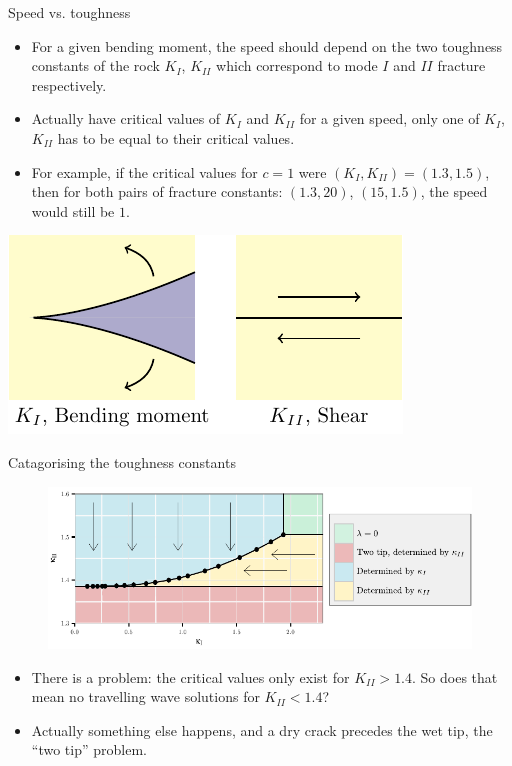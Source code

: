 \documentclass{beamer}
\begin{document}
\begin{frame}{Speed vs. toughness}
\begin{itemize}
\item For a given bending moment, the speed should depend on the two
      toughness constants of the rock $K_I$, $K_{II}$ which correspond to
      mode $I$ and $II$ fracture respectively.
\item Actually have critical values of $K_I$ and $K_{II}$ for a given speed,
      only one of $K_I$, $K_{II}$ has to be equal to their critical values.
\item For example, if the critical values for $c=1$ were $(K_I,K_{II}) = 
      (1.3,1.5)$, then for both pairs of fracture constants: $(1.3, 20)$, 
      $(15,1.5)$, the speed would still be $1$.
\end{itemize}
\begin{center}
\includegraphics[scale=0.8]{./../NumFig3.pdf}
\end{center}
\end{frame}

\begin{frame}{Catagorising the toughness constants}
\begin{figure}
  \centerline{\includegraphics[scale=0.8]{catagory.pdf}}
\end{figure}
\begin{itemize}
\item There is a problem: the critical values only exist for 
      $K_{II} > 1.4$. So does that mean no travelling wave solutions
      for $K_{II} < 1.4$?
\item Actually something else happens, and a dry crack precedes the 
      wet tip, the ``two tip'' problem.
\end{itemize}
\end{frame}
\end{document}

